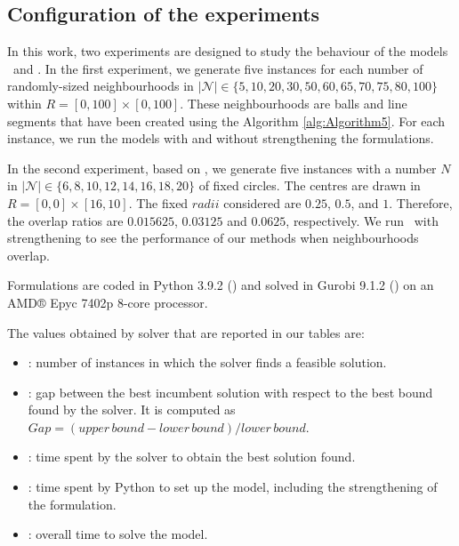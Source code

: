 \documentclass[a4paper,  review, authoryear, 1p., doubleblind]{elsarticle}
\newcommand{\TSPHN}{{\sf{H-TSPHN}\xspace }}
\newcommand{\TSPN}{{\sf{H-TSPN}\xspace }}
\begin{document}

\subsection{Configuration of the experiments}
In this work, two experiments are designed to study the behaviour of the models \TSPHN \ and \TSPN. In the first experiment, we generate five instances for each number of randomly-sized neighbourhoods in $|\mathcal N|\in\{5, 10, 20, 30, 50, 60, 65, 70, 75, 80, 100\}$ within $R=[0,100]\times[0, 100]$. These neighbourhoods are balls and line segments that have been created using the Algorithm \ref{alg:Algorithm5}. For each instance, we run the models with and without strengthening the formulations.

In the second experiment, based on \cite{behdani_integer-programming-based_2014}, we generate five instances with a number $N$ in $|\mathcal N|\in\{6, 8, 10, 12, 14, 16, 18, 20\}$ of fixed circles. The centres are drawn in $R=[0, 0]\times[16, 10]$. The fixed $radii$ considered are $0.25$, $0.5$, and $1$. Therefore, the overlap ratios are $0.015625$, $0.03125$ and $0.0625$, respectively. We run \TSPN \ with strengthening to see the performance of our methods when neighbourhoods overlap.

Formulations are coded in Python 3.9.2 (\citet{van_rossum_python_2009}) and solved in Gurobi 9.1.2 (\citet{gurobi_optimization_llc_gurobi_2022}) on an AMD® Epyc 7402p 8-core processor.

The values obtained by solver that are reported in our tables are:

\begin{itemize}
\item {}: number of instances in which the solver finds a feasible solution.
\item {}: gap between the best incumbent solution with respect to the best bound found by the solver. It is computed as $Gap=(upper\, bound - lower\, bound)/lower\, bound$.
\item {}: time spent by the solver to obtain the best solution found.
\item {}: time spent by Python to set up the model, including the strengthening of the formulation.
\item {}: overall time to solve the model.
\end{itemize}
\end{document}
